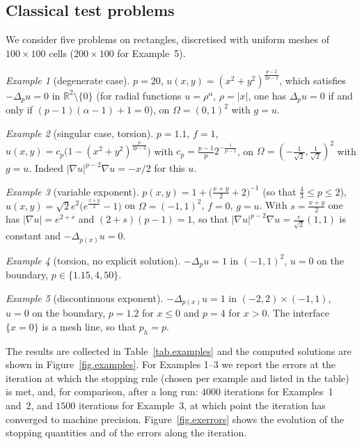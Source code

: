 \documentclass[11pt]{amsart}
\newcommand{\R}{\mathbb R}
\theoremstyle{definition}
\theoremstyle{remark}
\numberwithin{equation}{section}
\begin{document}
\subsection{Classical test problems}\label{sec.examples}
We consider five problems on rectangles, discretised with uniform meshes of $100\times100$ cells ($200\times100$ for Example~5).

\emph{Example 1} (degenerate case). $p=20$, $u(x,y)=(x^2+y^2)^{\frac{p-2}{2p-2}}$, which satisfies $-\Delta_pu=0$ in $\R^2\setminus\{0\}$ (for radial functions $u=\rho^\alpha$, $\rho=|x|$, one has $\Delta_pu=0$ if and only if $(p-1)(\alpha-1)+1=0$), on $\Omega=(0,1)^2$ with $g=u$.

\emph{Example 2} (singular case, torsion). $p=1.1$, $f=1$, $u(x,y)=c_p\big(1-(x^2+y^2)^{\frac p{2p-2}}\big)$ with $c_p=\frac{p-1}p2^{-\frac1{p-1}}$, on $\Omega=(-\tfrac1{\sqrt2},\tfrac1{\sqrt2})^2$ with $g=u$. Indeed $|\nabla u|^{p-2}\nabla u=-x/2$ for this $u$.

\emph{Example 3} (variable exponent). $p(x,y)=1+\big(\frac{x+y}2+2\big)^{-1}$ (so that $\frac43\le p\le2$), $u(x,y)=\sqrt2e^2\big(e^{\frac{x+y}2}-1\big)$ on $\Omega=(-1,1)^2$, $f=0$, $g=u$. With $s=\frac{x+y}2$ one has $|\nabla u|=e^{2+s}$ and $(2+s)(p-1)=1$, so that $|\nabla u|^{p-2}\nabla u=\frac{e}{\sqrt2}(1,1)$ is constant and $-\Delta_{p(x)}u=0$.

\emph{Example 4} (torsion, no explicit solution). $-\Delta_pu=1$ in $(-1,1)^2$, $u=0$ on the boundary, $p\in\{1.15,4,50\}$.

\emph{Example 5} (discontinuous exponent). $-\Delta_{p(x)}u=1$ in $(-2,2)\times(-1,1)$, $u=0$ on the boundary, $p=1.2$ for $x\le0$ and $p=4$ for $x>0$. The interface $\{x=0\}$ is a mesh line, so that $p_h=p$.

The results are collected in Table~\ref{tab.examples} and the computed solutions are shown in Figure~\ref{fig.examples}. For Examples 1--3 we report the errors at the iteration at which the stopping rule (chosen per example and listed in the table) is met, and, for comparison, after a long run: $4000$ iterations for Examples~1 and~2, and $1500$ iterations for Example~3, at which point the iteration has converged to machine precision. Figure~\ref{fig.exerrors} shows the evolution of the stopping quantities and of the errors along the iteration.
\end{document}
